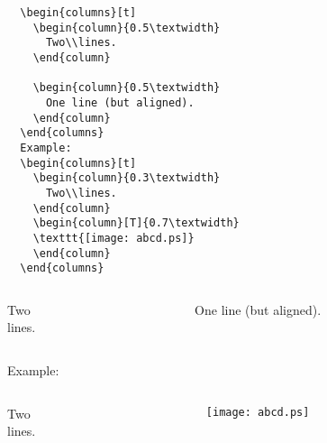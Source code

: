 \documentclass[hyperref={unicode}]{beamer}
\begin{document}
\begin{frame}[fragile]
\begin{block}{}
\tiny

\begin{verbatim}
  \begin{columns}[t] 
    \begin{column}{0.5\textwidth} 
      Two\\lines. 
    \end{column} 
  
    \begin{column}{0.5\textwidth} 
      One line (but aligned). 
    \end{column} 
  \end{columns} 
  Example: 
  \begin{columns}[t] 
    \begin{column}{0.3\textwidth} 
      Two\\lines. 
    \end{column}
    \begin{column}[T]{0.7\textwidth} 
    \texttt{[image: abcd.ps]} 
    \end{column}
  \end{columns} 
\end{verbatim}
\end{block}
\end{frame}


\begin{frame}
\begin{block}{}
  \begin{columns}[t] 
    \begin{column}{0.3\textwidth} 
      Two\\lines. 
    \end{column} 
  
    \begin{column}{0.3\textwidth} 
      One line (but aligned). 
    \end{column} 
  \end{columns} 
  
  Example: 
  
  \begin{columns}[c] 
    \begin{column}{0.1\textwidth} 
      Two\\lines. 
    \end{column}
    \begin{column}{0.5\textwidth} 
    \texttt{[image: abcd.ps]} 
    \end{column}
  \end{columns} 
\end{block}
\end{frame}
\end{document}
